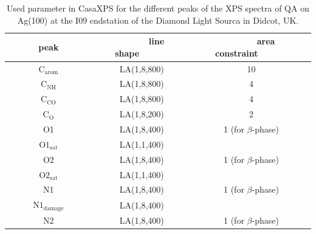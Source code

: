 \begin{table}[H]
	\centering
	\caption{Used parameter in CasaXPS\autocite{CASA2022} for the different peaks of the \ac{XPS} spectra of \ac{QA} on Ag(100) at the I09 endstation of the Diamond Light Sourca in Didcot, UK.}
\begin{tabular}{|c|c|c|}
	\hline
	~~~~~~peak~~~~~~ & ~~~~~~line shape~~~~~~ & ~~~~~~area constraint~~~~~~ \\
	\hline
	$\mathrm{C_{arom}}$ & LA(1,8,800) & 10 \\
	\hline
	$\mathrm{C_{NH}}$ & LA(1,8,800) & 4 \\
	\hline
	$\mathrm{C_{CO}}$ & LA(1,8,800) & 4 \\
	\hline
	$\mathrm{C_{O}}$ & LA(1,8,200) & 2 \\
	\hline \hline
	O1 & LA(1,8,400) & 1 (for $\beta$-phase) \\
	\hline
	$\mathrm{O1_{sat}}$ & LA(1,1,400) &  \\
	\hline
	O2 & LA(1,8,400) & 1 (for $\beta$-phase) \\
	\hline
	$\mathrm{O2_{sat}}$  & LA(1,1,400) &  \\
	\hline \hline
	N1 & LA(1,8,400) & 1 (for $\beta$-phase) \\
	\hline
	$\mathrm{N1_{damage}}$  & LA(1,8,400) &  \\
	\hline
	N2 & LA(1,8,400) & 1 (for $\beta$-phase) \\
	\hline
\end{tabular}
	\label{tab:casa}
\end{table}

\cleardoublepage
